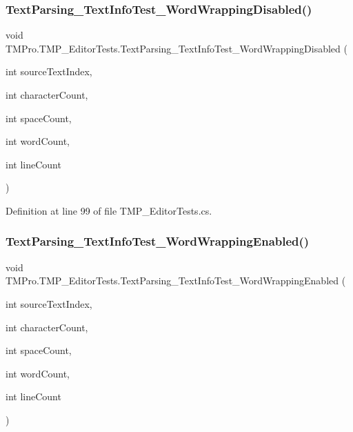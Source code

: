 \mbox{\label{class_t_m_pro_1_1_t_m_p___editor_tests_af019e99d147f82ded1b89035c53ddd4c}} 
\subsubsection{\texorpdfstring{TextParsing\_TextInfoTest\_WordWrappingDisabled()}{TextParsing\_TextInfoTest\_WordWrappingDisabled()}}
{\footnotesize\ttfamily void T\+M\+Pro.\+T\+M\+P\+\_\+\+Editor\+Tests.\+Text\+Parsing\+\_\+\+Text\+Info\+Test\+\_\+\+Word\+Wrapping\+Disabled (\begin{DoxyParamCaption}\item[{int}]{source\+Text\+Index,  }\item[{int}]{character\+Count,  }\item[{int}]{space\+Count,  }\item[{int}]{word\+Count,  }\item[{int}]{line\+Count }\end{DoxyParamCaption})}



Definition at line 99 of file T\+M\+P\+\_\+\+Editor\+Tests.\+cs.

\mbox{\label{class_t_m_pro_1_1_t_m_p___editor_tests_a50f97174c61f451c71a1297edeed2ef9}} 
\subsubsection{\texorpdfstring{TextParsing\_TextInfoTest\_WordWrappingEnabled()}{TextParsing\_TextInfoTest\_WordWrappingEnabled()}}
{\footnotesize\ttfamily void T\+M\+Pro.\+T\+M\+P\+\_\+\+Editor\+Tests.\+Text\+Parsing\+\_\+\+Text\+Info\+Test\+\_\+\+Word\+Wrapping\+Enabled (\begin{DoxyParamCaption}\item[{int}]{source\+Text\+Index,  }\item[{int}]{character\+Count,  }\item[{int}]{space\+Count,  }\item[{int}]{word\+Count,  }\item[{int}]{line\+Count }\end{DoxyParamCaption})}



